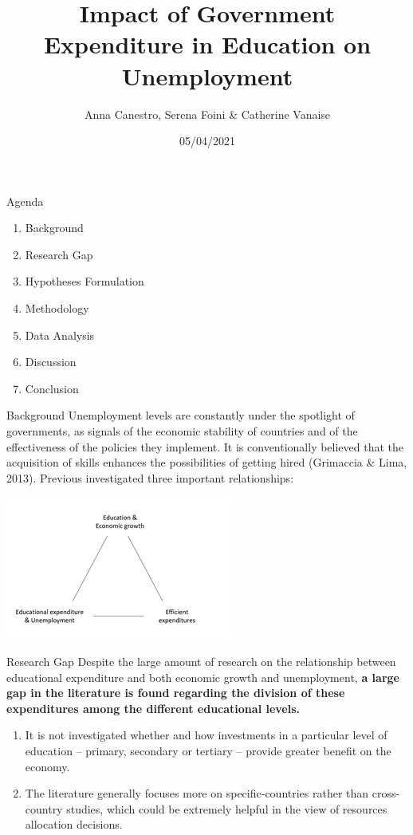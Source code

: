 \documentclass[
  ignorenonframetext,
]{beamer}
\title{Impact of Government Expenditure in Education on Unemployment}
\author{Anna Canestro, Serena Foini \& Catherine Vanaise}
\date{05/04/2021}
\providecommand{\tightlist}{%
  \setlength{\itemsep}{0pt}\setlength{\parskip}{0pt}}
\begin{document}
\frame{\titlepage}

\begin{frame}{Agenda}
\protect\hypertarget{agenda}{}
\begin{enumerate}
\tightlist
\item
  Background
\item
  Research Gap
\item
  Hypotheses Formulation
\item
  Methodology
\item
  Data Analysis\\
\item
  Discussion
\item
  Conclusion
\end{enumerate}
\end{frame}

\begin{frame}{Background}
\protect\hypertarget{background}{}
Unemployment levels are constantly under the spotlight of governments,
as signals of the economic stability of countries and of the
effectiveness of the policies they implement. It is conventionally
believed that the acquisition of skills enhances the possibilities of
getting hired (Grimaccia \& Lima, 2013). Previous investigated three
important relationships:

\includegraphics{./Immagine2.png}
\end{frame}

\begin{frame}{Research Gap}
\protect\hypertarget{research-gap}{}
Despite the large amount of research on the relationship between
educational expenditure and both economic growth and unemployment,
\textbf{a large gap in the literature is found regarding the division of
these expenditures among the different educational levels.}

\begin{enumerate}
\tightlist
\item
  It is not investigated whether and how investments in a particular
  level of education -- primary, secondary or tertiary -- provide
  greater benefit on the economy.
\item
  The literature generally focuses more on specific-countries rather
  than cross-country studies, which could be extremely helpful in the
  view of resources allocation decisions.
\end{enumerate}
\end{frame}
\end{document}
